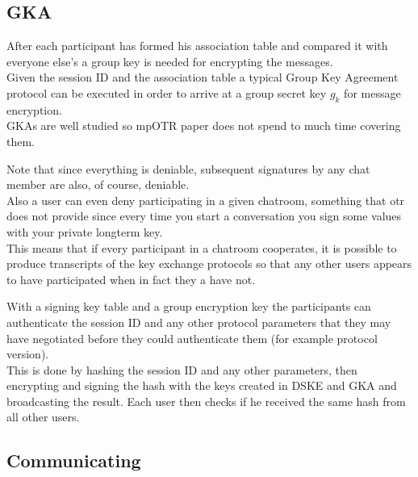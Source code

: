 \documentclass{beamer}
\begin{document}
\subsection{GKA}

\begin{frame}
After each participant has formed his association table and compared it with everyone else's a group key is needed for encrypting the messages.\\[0.5cm]

Given the session ID and the association table a typical Group Key Agreement protocol can be executed in order to arrive at a group secret key $g_k$ for message encryption.\\[0.5cm]

GKAs are well studied so mpOTR paper does not spend to much time covering them.
\end{frame}

\begin{frame}
Note that since everything is deniable, subsequent signatures by any chat member are also, of course, deniable.\\[0.5cm]

Also a user can even deny participating in a given chatroom, something that otr does not provide since every time you start a conversation you sign some values with your private longterm key.\\[0.5cm]

This means that if every participant in a chatroom cooperates, it is possible to produce transcripts of the key exchange protocols so that any other users appears to have participated when in fact they a have not.
\end{frame}

\begin{frame}
With a signing key table and a group encryption key the participants can authenticate the session ID and any other protocol parameters that they may have negotiated before they could authenticate them (for example protocol version).\\[0.5cm]

This is done by hashing the session ID and any other parameters, then encrypting and signing the hash with the keys created in DSKE and GKA and broadcasting the result. Each user then checks if he received the same hash from all other users.
\end{frame}

\subsection{Communicating}
\end{document}
